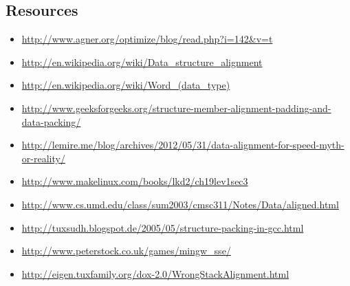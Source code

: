 \documentclass{beamer}
\begin{document}
\subsection{Resources}
\begin{frame}{\insertsection}{\insertsubsection}
	\begin{itemize}
        \tiny
        \item \url{http://www.agner.org/optimize/blog/read.php?i=142&v=t}
        \item \url{http://en.wikipedia.org/wiki/Data_structure_alignment}
        \item \url{http://en.wikipedia.org/wiki/Word_(data_type)}
        \item \url{http://www.geeksforgeeks.org/structure-member-alignment-padding-and-data-packing/}
        \item \url{http://lemire.me/blog/archives/2012/05/31/data-alignment-for-speed-myth-or-reality/}
        \item \url{http://www.makelinux.com/books/lkd2/ch19lev1sec3}
        \item \url{http://www.cs.umd.edu/class/sum2003/cmsc311/Notes/Data/aligned.html}
        \item \url{http://tuxsudh.blogspot.de/2005/05/structure-packing-in-gcc.html}
        \item \url{http://www.peterstock.co.uk/games/mingw_sse/}
        \item \url{http://eigen.tuxfamily.org/dox-2.0/WrongStackAlignment.html}
	\end{itemize}
\end{frame}
\end{document}
